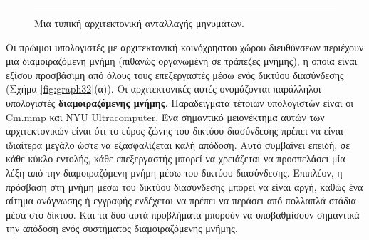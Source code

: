 \documentclass[12pt,a4paper]{article} %
\begin{document}
\vspace{0.3cm}
\begin{figure}[H]
\centering
{}
\noindent\rule{\textwidth}{0.2pt}
\caption{Μια τυπική αρχιτεκτονική ανταλλαγής μηνυμάτων.}
\label{fig:graph31}
\end{figure}
\vspace{0.3cm}

Οι πρώιμοι υπολογιστές με αρχιτεκτονική κοινόχρηστου χώρου διευθύνσεων 
περιέχουν μια διαμοιραζόμενη μνήμη (πιθανώς οργανωμένη σε τράπεζες μνήμης), 
η οποία είναι εξίσου προσβάσιμη από όλους τους επεξεργαστές μέσω ενός 
δικτύου διασύνδεσης {(}Σχήμα \ref{fig:graph32}(α){)}. Οι αρχιτεκτονικές αυτές ονομάζονται 
παράλληλοι υπολογιστές \textbf{διαμοιραζόμενης μνήμης}. Παραδείγματα τέτοιων 
υπολογιστών είναι οι Cm.mmp και NYU Ultracomputer. Ένα σημαντικό 
μειονέκτημα αυτών των αρχιτεκτονικών είναι ότι το εύρος ζώνης του 
δικτύου διασύνδεσης πρέπει να είναι ιδιαίτερα μεγάλο ώστε να εξασφαλίζεται 
καλή απόδοση. Αυτό συμβαίνει επειδή, σε κάθε κύκλο εντολής, κάθε 
επεξεργαστής μπορεί να χρειάζεται να προσπελάσει μία λέξη από την 
διαμοιραζόμενη μνήμη μέσω του δικτύου διασύνδεσης. Επιπλέον, η πρόσβαση 
στη μνήμη μέσω του δικτύου διασύνδεσης μπορεί να είναι αργή, καθώς ένα 
αίτημα ανάγνωσης ή εγγραφής ενδέχεται να πρέπει να περάσει από πολλαπλά 
στάδια μέσα στο δίκτυο. Και τα δύο αυτά προβλήματα μπορούν να υποβαθμίσουν 
σημαντικά την απόδοση ενός συστήματος διαμοιραζόμενης μνήμης.  
\end{document}
